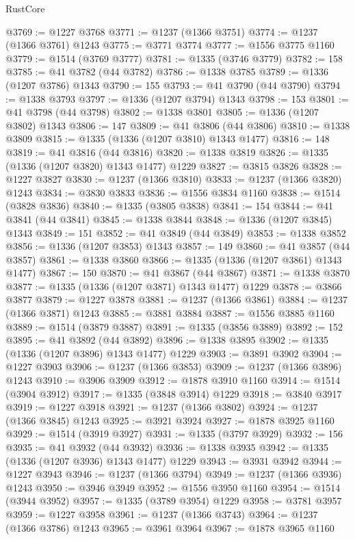 \begin{lexlean}{RustCore}
\begin{coremodule}
@3769 := @1227 @3768
@3771 := @1237 (@1366 @3751)
@3774 := @1237 (@1366 @3761) @1243
@3775 := @3771 @3774
@3777 := @1556 @3775 @1160
@3779 := @1514 (@3769 @3777)
@3781 := @1335 (@3746 @3779)
@3782 := 158
@3785 := @41 @3782 (@44 @3782)
@3786 := @1338 @3785
@3789 := @1336 (@1207 @3786) @1343
@3790 := 155
@3793 := @41 @3790 (@44 @3790)
@3794 := @1338 @3793
@3797 := @1336 (@1207 @3794) @1343
@3798 := 153
@3801 := @41 @3798 (@44 @3798)
@3802 := @1338 @3801
@3805 := @1336 (@1207 @3802) @1343
@3806 := 147
@3809 := @41 @3806 (@44 @3806)
@3810 := @1338 @3809
@3815 := @1335 (@1336 (@1207 @3810) @1343 @1477)
@3816 := 148
@3819 := @41 @3816 (@44 @3816)
@3820 := @1338 @3819
@3826 := @1335 (@1336 (@1207 @3820) @1343 @1477) @1229
@3827 := @3815 @3826
@3828 := @1227 @3827
@3830 := @1237 (@1366 @3810)
@3833 := @1237 (@1366 @3820) @1243
@3834 := @3830 @3833
@3836 := @1556 @3834 @1160
@3838 := @1514 (@3828 @3836)
@3840 := @1335 (@3805 @3838)
@3841 := 154
@3844 := @41 @3841 (@44 @3841)
@3845 := @1338 @3844
@3848 := @1336 (@1207 @3845) @1343
@3849 := 151
@3852 := @41 @3849 (@44 @3849)
@3853 := @1338 @3852
@3856 := @1336 (@1207 @3853) @1343
@3857 := 149
@3860 := @41 @3857 (@44 @3857)
@3861 := @1338 @3860
@3866 := @1335 (@1336 (@1207 @3861) @1343 @1477)
@3867 := 150
@3870 := @41 @3867 (@44 @3867)
@3871 := @1338 @3870
@3877 := @1335 (@1336 (@1207 @3871) @1343 @1477) @1229
@3878 := @3866 @3877
@3879 := @1227 @3878
@3881 := @1237 (@1366 @3861)
@3884 := @1237 (@1366 @3871) @1243
@3885 := @3881 @3884
@3887 := @1556 @3885 @1160
@3889 := @1514 (@3879 @3887)
@3891 := @1335 (@3856 @3889)
@3892 := 152
@3895 := @41 @3892 (@44 @3892)
@3896 := @1338 @3895
@3902 := @1335 (@1336 (@1207 @3896) @1343 @1477) @1229
@3903 := @3891 @3902
@3904 := @1227 @3903
@3906 := @1237 (@1366 @3853)
@3909 := @1237 (@1366 @3896) @1243
@3910 := @3906 @3909
@3912 := @1878 @3910 @1160
@3914 := @1514 (@3904 @3912)
@3917 := @1335 (@3848 @3914) @1229
@3918 := @3840 @3917
@3919 := @1227 @3918
@3921 := @1237 (@1366 @3802)
@3924 := @1237 (@1366 @3845) @1243
@3925 := @3921 @3924
@3927 := @1878 @3925 @1160
@3929 := @1514 (@3919 @3927)
@3931 := @1335 (@3797 @3929)
@3932 := 156
@3935 := @41 @3932 (@44 @3932)
@3936 := @1338 @3935
@3942 := @1335 (@1336 (@1207 @3936) @1343 @1477) @1229
@3943 := @3931 @3942
@3944 := @1227 @3943
@3946 := @1237 (@1366 @3794)
@3949 := @1237 (@1366 @3936) @1243
@3950 := @3946 @3949
@3952 := @1556 @3950 @1160
@3954 := @1514 (@3944 @3952)
@3957 := @1335 (@3789 @3954) @1229
@3958 := @3781 @3957
@3959 := @1227 @3958
@3961 := @1237 (@1366 @3743)
@3964 := @1237 (@1366 @3786) @1243
@3965 := @3961 @3964
@3967 := @1878 @3965 @1160

\end{coremodule}
\end{lexlean}
